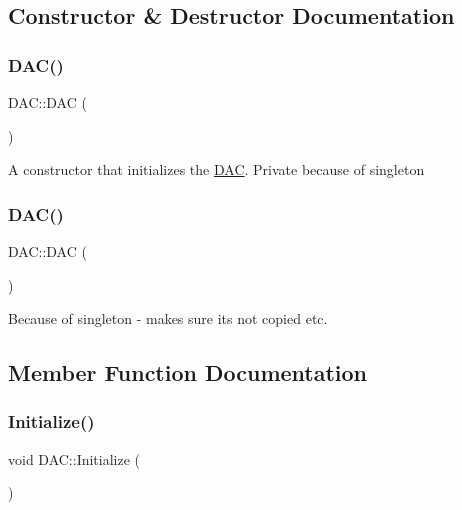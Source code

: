 \subsection{Constructor \& Destructor Documentation}
\hypertarget{class_d_a_c_a9908e07a5c096380eeb4c4061d58476d}{}\label{class_d_a_c_a9908e07a5c096380eeb4c4061d58476d} 
\subsubsection{\texorpdfstring{D\+A\+C()}{DAC()}\hspace{0.1cm}{\footnotesize\ttfamily [1/2]}}
{\footnotesize\ttfamily D\+A\+C\+::\+D\+AC (\begin{DoxyParamCaption}{ }\end{DoxyParamCaption})\hspace{0.3cm}{\ttfamily [private]}}

A constructor that initializes the \hyperlink{class_d_a_c}{D\+AC}. Private because of singleton \hypertarget{class_d_a_c_af656669246f70c7ccbbd05d0e65088d4}{}\label{class_d_a_c_af656669246f70c7ccbbd05d0e65088d4} 
\subsubsection{\texorpdfstring{D\+A\+C()}{DAC()}\hspace{0.1cm}{\footnotesize\ttfamily [2/2]}}
{\footnotesize\ttfamily D\+A\+C\+::\+D\+AC (\begin{DoxyParamCaption}\item[{const \hyperlink{class_d_a_c}{D\+AC} \&}]{ }\end{DoxyParamCaption})\hspace{0.3cm}{\ttfamily [delete]}}

Because of singleton -\/ makes sure its not copied etc. 

\subsection{Member Function Documentation}
\hypertarget{class_d_a_c_a834456c539ee1936f7da8e4bfaa407f0}{}\label{class_d_a_c_a834456c539ee1936f7da8e4bfaa407f0} 
\subsubsection{\texorpdfstring{Initialize()}{Initialize()}}
{\footnotesize\ttfamily void D\+A\+C\+::\+Initialize (\begin{DoxyParamCaption}{ }\end{DoxyParamCaption})}

